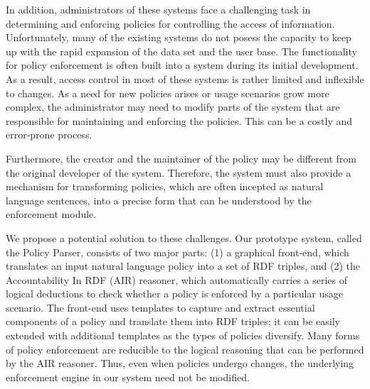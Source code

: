 \documentclass{llncs}
\begin{document}
In addition, administrators of these systems face a challenging task in determining and enforcing policies
for controlling the access of information. Unfortunately, many of the existing systems do not posess the
capacity to keep up with the rapid expansion of the data set and the
user base. The functionality for policy enforcement is often built
into a system during its initial development. As a result, access
control in most of these systems is rather limited and inflexible to changes.
As a need for new policies arises or usage scenarios grow
more complex, the administrator may need to modify parts of the system
that are responsible for maintaining and enforcing the policies. This
can be a costly and error-prone process. 

Furthermore, the creator and the maintainer of the policy may be
different from the original developer of the system. Therefore, the
system must also provide a mechanism for transforming policies, 
which are often incepted as natural language sentences, into a precise
form that can be understood by the enforcement module.

We propose a potential solution to these challenges. Our prototype
system, called the Policy Parser, consists of two major parts:
(1) a graphical front-end, which translates an input natural language policy
into a set of RDF triples, and (2) the Accountability In RDF (AIR)
reasoner, which automatically carries a series of logical
deductions to check whether a policy is enforced by a particular usage
scenario. The front-end uses templates to capture and extract
essential components of a policy and translate them into RDF triples;
it can be easily extended with additional templates as the types of
policies diversify. Many forms of policy enforcement are
reducible to the logical reasoning that can be performed by the AIR
reasoner. Thus, even when policies undergo changes, the
underlying enforcement engine in our system need not be modified.

\end{document}
